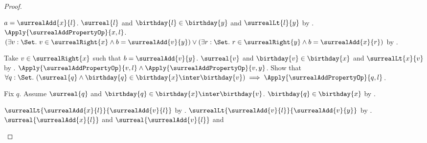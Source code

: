 \begin{proof}
\begin{subproof}
\begin{subproof}
\begin{byCase}
                        $a=\surrealAdd{x}{l}$.
                    $\surreal{l}$ and
                        $\birthday{l}\in\birthday{y}$ and
                        $\surrealLt{l}{y}$
                        by .
                    $\Apply{\surrealAddPropertyOp}{x,l}$.
                    $(\exists v:\Set.\ v\in\surrealRight{x}\land
                            b=\surrealAdd{v}{y})
                        \lor
                        (\exists r:\Set.\ r\in\surrealRight{y}\land
                            b=\surrealAdd{x}{r})$
                        by .
                    \begin{byCase}
                            Take $v\in\surrealRight{x}$ such that
                                $b=\surrealAdd{v}{y}$.
                            $\surreal{v}$ and
                                $\birthday{v}\in\birthday{x}$ and
                                $\surrealLt{x}{v}$
                                by .
                            $\Apply{\surrealAddPropertyOp}{v,l}
                                \land
                                \Apply{\surrealAddPropertyOp}{v,y}$.
                            Show that $\forall q:\Set.\ (\surreal{q}\land
                                \birthday{q}\in
                                    \birthday{x}\inter\birthday{v})
                                \implies
                                \Apply{\surrealAddPropertyOp}{q,l}$.
                            \begin{subproof}
                                Fix $q$.
                                Assume $\surreal{q}$ and
                                    $\birthday{q}\in
                                        \birthday{x}\inter\birthday{v}$.
                                $\birthday{q}\in\birthday{x}$
                                    by .
                            \end{subproof}
                            $\surrealLt{\surrealAdd{x}{l}}
                                {\surrealAdd{v}{l}}$
                                by .
                            $\surrealLt{\surrealAdd{v}{l}}
                                {\surrealAdd{v}{y}}$
                                by .
                            $\surreal{\surrealAdd{x}{l}}$ and
                                $\surreal{\surrealAdd{v}{l}}$ and

\end{byCase}
\end{byCase}
\end{subproof}
\end{subproof}
\end{proof}
